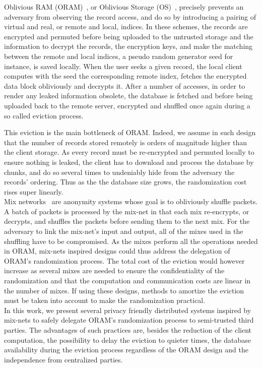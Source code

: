 \documentclass[USenglish,oneside,twocolumn]{article}
\begin{document}
Oblivious RAM (ORAM)~\cite{goldreich87}, or Oblivious Storage (OS)~\cite{boneh2011}, precisely prevents an adversary from observing the record access, and do so by introducing a pairing of virtual and real, or remote and local, indices. In these schemes, the records are encrypted and permuted before being uploaded to the untrusted storage and the information to decrypt the records, the encryption keys, and make the matching between the remote and local indices, a pseudo random generator seed for instance, is saved locally. When the user seeks a given record, the local client computes with the seed the corresponding remote index, fetches the encrypted data block obliviously and decrypts it. After a number of accesses, in order to render any leaked information obsolete, the database is fetched and before being uploaded back to the remote server, encrypted and shuffled once again during a so called eviction process.

This eviction is the main bottleneck of ORAM. Indeed, we assume in such design that the number of records stored remotely is orders of magnitude higher than the client storage. As every record must be re-encrypted and permuted locally to ensure nothing is leaked, the client has to download and process the database by chunks, and do so several times to undeniably hide from the adversary the records' ordering. Thus as the the database size grows, the randomization cost rises super linearly.\\

Mix networks~\cite{chaum1981untraceable} are anonymity systems whose goal is to obliviously shuffle packets. A batch of packets is processed by the mix-net in that each mix re-encrypts, or decrypts, and shuffles the packets before sending them to the next mix. For the adversary to link the mix-net's input and output, all of the mixes used in the shuffling have to be compromised.
As the mixes perform all the operations needed in ORAM, mix-nets inspired designs could thus address the delegation of ORAM's randomization process. The total cost of the eviction would however increase as several mixes are needed to ensure the confidentiality of the randomization and that the computation and communication costs are linear in the number of mixes. If using these designs, methods to amortize the eviction must be taken into account to make the randomization practical.\\

In this work, we present several privacy friendly distributed systems inspired by mix-nets to safely delegate ORAM's randomization process to semi-trusted third parties.
The advantages of such practices are, besides the reduction of the client computation, the possibility to delay the eviction to quieter times, the database availability during the eviction process regardless of the ORAM design and the independence from centralized parties.\\
\end{document}
